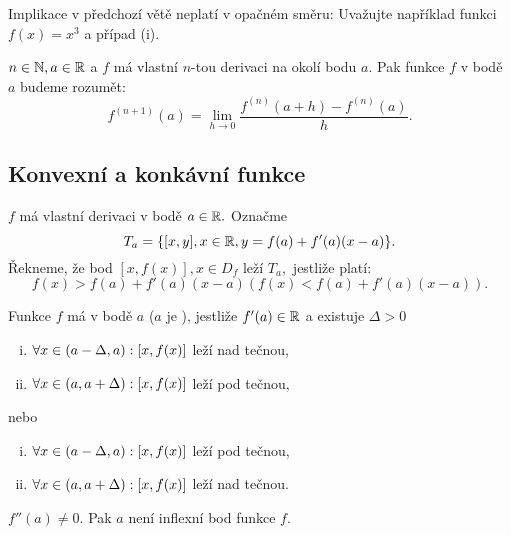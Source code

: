 \begin{remark}
    Implikace v předchozí větě neplatí v opačném směru: Uvažujte například
    funkci $f(x) = x^3$ a případ (i).
\end{remark}

\begin{definition}
    \Necht $n \in \mathbb{N}, a \in \mathbb{R}$ a \necht $f$ má vlastní $n$-tou derivaci na okolí
    bodu $a.$ Pak  funkce $f$ v bodě $a$ budeme rozumět:
    $$f^{(n+1)}(a) = \lim_{h \to 0} \frac{f^{(n)}(a + h) - f^{(n)}(a)}{h}.$$
\end{definition}

\subsection{Konvexní a konkávní funkce}

\begin{definition}
    \Necht $f$ má vlastní derivaci v bodě $a \in \mathbb{R}.$ Označme
    $$T_a = \{[x,y], x \in \mathbb{R}, y = f(a) + f'(a)(x-a)\}.$$
    Řekneme, že bod $[x, f(x)], x \in D_f$ leží  $T_a,$
    jestliže platí:
    $$f(x) > f(a) + f'(a)(x-a) (f(x) < f(a) + f'(a)(x-a)).$$
\end{definition}

\begin{definition}
    Funkce $f$ má v bodě $a$  ($a$ je ),
    jestliže $f'(a) \in \mathbb{R}$ a existuje $\Delta > 0$ \tz
    \begin{enumerate}[(i)]
        \item $\forall x \in (a-\Delta, a): [x,f(x)]$ leží nad tečnou,
        \item $\forall x \in (a, a+ \Delta): [x,f(x)]$ leží pod tečnou,
    \end{enumerate}
    nebo
    \begin{enumerate}[(i)]
        \item $\forall x \in (a-\Delta, a): [x,f(x)]$ leží pod tečnou,
        \item $\forall x \in (a, a+ \Delta): [x,f(x)]$ leží nad tečnou.
    \end{enumerate}
\end{definition}

\begin{theorem}
    \Necht $f''(a) \neq 0.$ Pak $a$ není inflexní bod funkce $f.$
\end{theorem}

